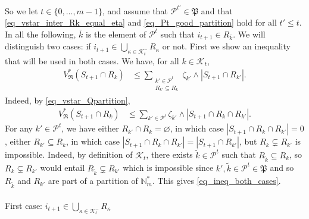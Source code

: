 \documentclass[
  11pt,
  a4paper,
]{article}
\makeatletter
\let\oldparagraph\paragraph
\renewcommand{\paragraph}{
    \@ifstar
      \xxxParagraphStar
      \xxxParagraphNoStar
  }
\newcommand{\xxxParagraphStar}[1]{\oldparagraph*{#1}\mbox{}}
\newcommand{\xxxParagraphNoStar}[1]{\oldparagraph{#1}\mbox{}}
\theoremstyle{plain}
\theoremstyle{plain}
\theoremstyle{definition}
\theoremstyle{plain}
\theoremstyle{definition}
\theoremstyle{remark}
\makeatother
\begin{document}
So we let \(t\in\{ 0,\dotsc,m-1\}\), and assume that
\(\mathcal{P}^{t'}\in\mathfrak P\) and that
\eqref{eq_vstar_inter_Rk_equal_eta} and \eqref{eq_Pt_good_partition}
hold for all \(t'\leq t\). In all the following, \(\bar k\) is the
element of \(\mathcal{P}^t\) such that \(i_{t+1}\in R_{\bar k}\). We
will distinguish two cases: if
\(i_{t+1}\in\bigcup_{\kappa\in\mathcal{K}^-_{t}}R_{\kappa}\) or not.
First we show an inequality that will be used in both cases. We have,
for all \(k\in\mathcal{K}_t\), \begin{align}
V^*_{\mathfrak{R}}(S_{t+1}\cap R_k)&\leq \sum_{\substack{k'\in\mathcal{P}^{t}\\R_{k'}\subseteq R_k}} \zeta_{k'}\wedge |S_{t+1}\cap R_{k'}|.\label{eq_ineq_both_cases}
\end{align} Indeed, by \eqref{eq_vstar_Qpartition}, \begin{align*}
V^*_{\mathfrak{R}}(S_{t+1}\cap R_k)&\leq  \sum_{k'\in\mathcal{P}^{t}} \zeta_{k'}\wedge |S_{t+1}\cap R_k \cap R_{k'}|.
\end{align*} For any \(k'\in\mathcal{P}^{t}\), we have either
\(R_{k'}\cap R_k=\varnothing\), in which case
\(|S_{t+1}\cap R_k \cap R_{k'}|=0\), either \(R_{k'}\subseteq R_k\), in
which case \(|S_{t+1}\cap R_k \cap R_{k'}|=|S_{t+1} \cap R_{k'}|\), but
\(R_{k}\subsetneq R_{k'}\) is impossible. Indeed, by definition of
\(\mathcal{K}_t\), there exists \(\tilde k\in \mathcal{P}^t\) such that
\(R_{\tilde k}\subseteq R_k\), so \(R_{k}\subsetneq R_{k'}\) would
entail \(R_{\tilde k}\subsetneq R_{k'}\) which is impossible since
\(k', \tilde k\in \mathcal{P}^t\in\mathfrak P\) and so \(R_{\tilde k}\)
and \(R_{k'}\) are part of a partition of \(\mathbb{N}_m^*\). This gives
\eqref{eq_ineq_both_cases}.

\paragraph{\texorpdfstring{First case:
\(i_{t+1}\in\bigcup_{\kappa\in\mathcal{K}^-_{t}}R_{\kappa}\)}{First case: i\_\{t+1\}\textbackslash in\textbackslash bigcup\_\{\textbackslash kappa\textbackslash in\textbackslash mathcal\{K\}\^{}-\_\{t\}\}R\_\{\textbackslash kappa\}}}\label{first-case-i_t1inbigcup_kappainmathcalk-_tr_kappa}
\end{document}
